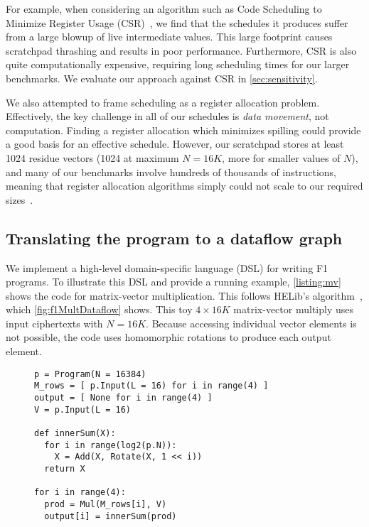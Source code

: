 For example, when considering an algorithm such as Code Scheduling to Minimize
Register Usage (CSR)~\cite{goodman:ics1988:code}, we find that the schedules it
produces suffer from a large blowup of live intermediate values. This large
footprint causes scratchpad thrashing and results in poor performance.
Furthermore, CSR is also quite computationally expensive, requiring long
scheduling times for our larger benchmarks. We evaluate our approach against
CSR in \autoref{sec:sensitivity}.

We also attempted to frame scheduling as a register allocation problem.
Effectively, the key challenge in all of our schedules is \emph{data movement},
not computation. Finding a register allocation which minimizes spilling could
provide a good basis for an effective schedule. However, our scratchpad stores
at least 1024 residue vectors (1024 at maximum $N = 16K$, more for smaller
values of $N$), and many of our benchmarks involve hundreds of thousands of
instructions, meaning that register allocation algorithms simply could not
scale to our required sizes~\cite{barany:odes2011:register,
xu:sigplan2007:tetris, touati:ijpp2005:register, berson:pact1993:ursa}.

\subsection{Translating the program to a dataflow graph}
\label{sec:programming}

We implement a high-level domain-specific language (DSL) for writing F1
programs. To illustrate this DSL and provide a running example,
\autoref{listing:mv} shows the code for matrix-vector multiplication. This
follows HELib's algorithm~\cite{halevi:crypto14:algorithms}, which
\autoref{fig:f1MultDataflow} shows. This toy $4 \times 16K$ matrix-vector
multiply uses input ciphertexts with $N=16K$. Because accessing individual
vector elements is not possible, the code uses homomorphic rotations to produce
each output element.

\figFOneMultDataflow

\begin{figure}
\begin{center}
  \begin{lstlisting}[caption={$(4 \times 16K)$ matrix-vector multiply in F1's DSL.}, mathescape=true, style=custompython, label=listing:mv]
p = Program(N = 16384)
M_rows = [ p.Input(L = 16) for i in range(4) ]
output = [ None for i in range(4) ]
V = p.Input(L = 16)

def innerSum(X):
  for i in range(log2(p.N)):
    X = Add(X, Rotate(X, 1 << i))
  return X

for i in range(4):
  prod = Mul(M_rows[i], V)
  output[i] = innerSum(prod)
  \end{lstlisting}
\end{center}
\vspace{0.15cm}
\end{figure}

